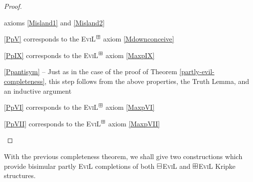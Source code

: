 \begin{proof}
\begin{minipage}[b]{0.5\linewidth}
\begin{empt}
     axioms \eqref{Misland1} and \eqref{Misland2}
    \item \ref{PpV} corresponds to the \textsc{EviL}$^\boxplus$
     axiom \eqref{Mdownconceive}
    \item \ref{PpIX} corresponds to the \textsc{EviL}$^\boxplus$
     axiom \eqref{MaxpIX}
    \item \ref{Ppantisym} -- 
     Just as in the case of the proof of Theorem 
    \ref{partly-evil-completeness}, this step follows from the above
  properties, the Truth Lemma, and an inductive argument
     \item \ref{PpVI} corresponds to the \textsc{EviL}$^\boxplus$
     axiom \eqref{MaxpVI}
     \item \ref{PpVII} corresponds to the \textsc{EviL}$^\boxplus$
     axiom \eqref{MaxpVII}
  \end{empt}
\end{minipage}
\end{proof}

With the previous completeness theorem, we shall give two constructions which
provide bisimular partly \textsc{EviL} completions of 
both $\boxminus$\textsc{EviL} and $\boxplus$\textsc{EviL} Kripke
structures.

